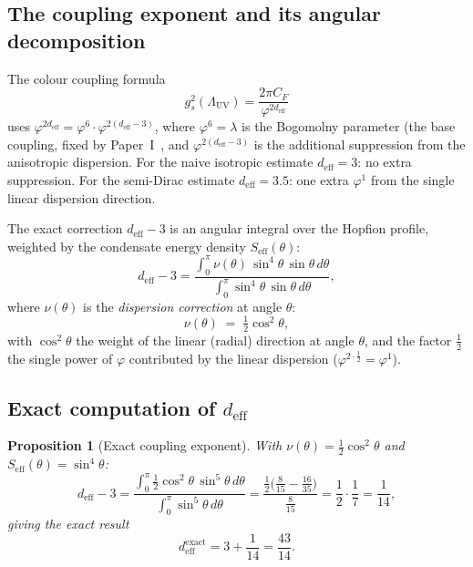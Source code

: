 \documentclass[11pt,a4paper]{article}
\newtheorem{proposition}[theorem]{Proposition}
\theoremstyle{definition}
\theoremstyle{remark}
\newcommand{\vp}{\varphi}
\newcommand{\lam}{\lambda}
\newcommand{\LUV}{\Lambda_{\mathrm{UV}}}
\newcommand{\deff}{d_{\mathrm{eff}}}
\begin{document}
\subsection{The coupling exponent and its angular decomposition}

The colour coupling formula
\begin{equation}
  g_s^2(\LUV)
  = \frac{2\pi C_F}{\vp^{2\deff}}
  \label{P5:eq:gs_deff}
\end{equation}
uses $\vp^{2\deff} = \vp^6\cdot\vp^{2(\deff-3)}$, where $\vp^6=\lam$
is the Bogomolny parameter (the base coupling, fixed by Paper~I~\cite{Paper1}, and
$\vp^{2(\deff-3)}$ is the additional suppression from the anisotropic
dispersion.
For the naive isotropic estimate $\deff=3$: no extra suppression.
For the semi-Dirac estimate $\deff=3.5$: one extra $\vp^1$ from the
single linear dispersion direction.

The exact correction $\deff-3$ is an angular integral over the Hopfion
profile, weighted by the condensate energy density $S_{\mathrm{eff}}(\theta)$:
\begin{equation}
  \deff - 3
  = \frac{\displaystyle\int_0^\pi
    \nu(\theta)\,\sin^4\!\theta\,\sin\theta\,d\theta}
         {\displaystyle\int_0^\pi \sin^4\!\theta\,\sin\theta\,d\theta},
  \label{P5:eq:deff_integral}
\end{equation}
where $\nu(\theta)$ is the \emph{dispersion correction} at angle $\theta$:
\begin{equation}
  \nu(\theta) \;=\; \tfrac{1}{2}\cos^2\!\theta,
  \label{P5:eq:nu_theta}
\end{equation}
with $\cos^2\!\theta$ the weight of the linear (radial) direction
at angle $\theta$, and the factor $\tfrac{1}{2}$ the single power
of $\vp$ contributed by the linear dispersion
($\vp^{2\cdot\frac{1}{2}} = \vp^1$).

\subsection{Exact computation of $d_{\mathrm{eff}}$}

\begin{proposition}[Exact coupling exponent]
\label{P5:prop:deff_exact}
With $\nu(\theta) = \tfrac{1}{2}\cos^2\!\theta$ and
$S_{\mathrm{eff}}(\theta) = \sin^4\!\theta$:
\begin{equation}
  \deff - 3
  = \frac{\displaystyle\int_0^\pi
    \tfrac{1}{2}\cos^2\!\theta\,\sin^5\!\theta\,d\theta}
         {\displaystyle\int_0^\pi \sin^5\!\theta\,d\theta}
  = \frac{\tfrac{1}{2}\bigl(\tfrac{8}{15}-\tfrac{16}{35}\bigr)}{\tfrac{8}{15}}
  = \frac{1}{2}\cdot\frac{1}{7}
  = \frac{1}{14},
  \label{P5:eq:deff_minus3}
\end{equation}
giving the exact result
\begin{equation}
  \boxed{\deff^{\mathrm{exact}} = 3 + \frac{1}{14} = \frac{43}{14}.}
  \label{P5:eq:deff_exact_result}
\end{equation}
\end{proposition}
\end{document}
